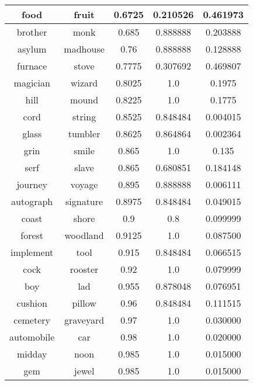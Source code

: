 \begin{center}
{\begin{longtable}{|c|c|c|c|c|}
\hline
food & fruit & 0.6725 & 0.210526 & 0.461973 \\
\hline
brother & monk & 0.685 & 0.888888 & 0.203888 \\
\hline
asylum & madhouse & 0.76 & 0.888888 & 0.128888 \\
\hline
furnace & stove & 0.7775 & 0.307692 & 0.469807 \\
\hline
magician & wizard & 0.8025 & 1.0 & 0.1975 \\
\hline
hill & mound & 0.8225 & 1.0 & 0.1775 \\
\hline
cord & string & 0.8525 & 0.848484 & 0.004015 \\
\hline
glass & tumbler & 0.8625 & 0.864864 & 0.002364 \\
\hline
grin & smile & 0.865 & 1.0 & 0.135 \\
\hline
serf & slave & 0.865 & 0.680851 & 0.184148 \\
\hline
journey & voyage & 0.895 & 0.888888 & 0.006111 \\
\hline
autograph & signature & 0.8975 & 0.848484 & 0.049015 \\
\hline
coast & shore & 0.9 & 0.8 & 0.099999 \\
\hline
forest & woodland & 0.9125 & 1.0 & 0.087500 \\
\hline
implement & tool & 0.915 & 0.848484 & 0.066515 \\
\hline
cock & rooster & 0.92 & 1.0 & 0.079999 \\
\hline
boy & lad & 0.955 & 0.878048 & 0.076951 \\
\hline
cushion & pillow & 0.96 & 0.848484 & 0.111515 \\
\hline
cemetery & graveyard & 0.97 & 1.0 & 0.030000 \\
\hline
automobile & car & 0.98 & 1.0 & 0.020000 \\
\hline
midday & noon & 0.985 & 1.0 & 0.015000 \\
\hline
gem & jewel & 0.985 & 1.0 & 0.015000 \\
\hline
\end{longtable}
}
\end{center}

